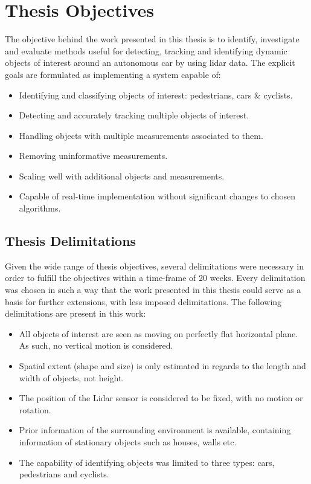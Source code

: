 \section{Thesis Objectives}
The objective behind the work presented in this thesis is to identify, investigate and evaluate methods useful for detecting, tracking and identifying dynamic objects of interest around an autonomous car by using lidar data. The explicit goals are formulated as implementing a system capable of:

\begin{itemize}
    \item Identifying and classifying objects of interest: pedestrians, cars \& cyclists. 
    \item Detecting and accurately tracking multiple objects of interest.
    \item Handling objects with multiple measurements associated to them.
    \item Removing uninformative measurements.
    \item Scaling well with additional objects and measurements. 
    \item Capable of real-time implementation without significant changes to chosen algorithms. 
\end{itemize}

\subsection{Thesis Delimitations}
Given the wide range of thesis objectives, several delimitations were necessary in order to fulfill the objectives within a time-frame of 20 weeks. Every delimitation was chosen in such a way that the work presented in this thesis could serve as a basis for further extensions, with less imposed delimitations. The following delimitations are present in this work:

\begin{itemize}
    \item All objects of interest are seen as moving on perfectly flat horizontal plane. As such, no vertical motion is considered. 
    \item Spatial extent (shape and size) is only estimated in regards to the length and width of objects, not height.
    \item The position of the Lidar sensor is considered to be fixed, with no motion or rotation. 
    \item Prior information of the surrounding environment is available, containing information of stationary objects such as houses, walls etc. 
    \item The capability of identifying objects was limited to three types: cars, pedestrians and cyclists. 
\end{itemize}

